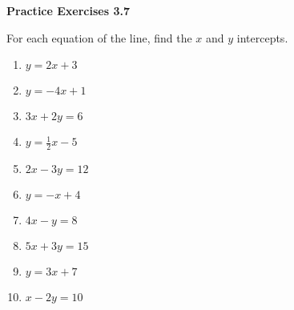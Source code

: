   \vspace{1ex}
\noindent\textbf{Practice Exercises 3.7}

\vspace{0.75ex}

For each equation of the line, find the $x$ and $y$ intercepts.
\begin{multicols}{2}
\begin{enumerate}[noitemsep, label = \color{blue}\arabic*. ]
    \item $y = 2x + 3$
    \item $y = -4x + 1$
    \item $3x + 2y = 6$
    \item $y = \frac{1}{2}x - 5$
    \item $2x - 3y = 12$
    \item $y = -x + 4$
    \item $4x - y = 8$
    \item $5x + 3y = 15$
    \item $y = 3x + 7$
    \item $x - 2y = 10$
\end{enumerate}
\end{multicols}

